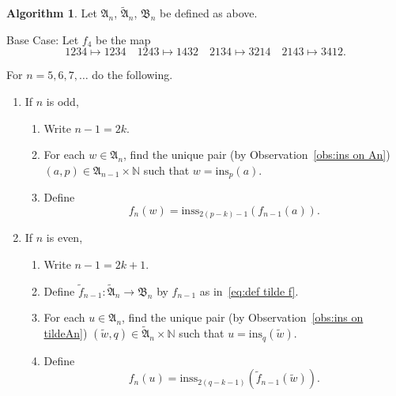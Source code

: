 \documentclass[12pt]{amsart}
\theoremstyle{definition}
\newtheorem{alg}[thm]{Algorithm}
\numberwithin{equation}{section}
\newcommand{\ins}[1]{\mathrm{ins}_{#1}}
\newcommand{\inss}[1]{\mathrm{inss}_{#1}}
\begin{document}
\begin{alg}\label{keyalg}
Let $\mathfrak A_n$, $\tilde{\mathfrak A}_n$, $\mathfrak B_n$ be defined as above.

Base Case: Let $f_4$ be the map
\begin{equation}\label{alg base case}
    1234 \longmapsto 1234 \quad 1243 \longmapsto 1432 \quad 2134 \longmapsto 3214 \quad 2143 \longmapsto 3412.
\end{equation}

For $n=5,6,7,\dotsc$ do the following.
\begin{enumerate}
\item If $n$ is odd,
\begin{enumerate}
    \item[a.] Write $n-1 = 2k$.
    \item[b.] For each $w\in \mathfrak A_n$, find the unique pair (by Observation~\ref{obs:ins on An}) $(a,p) \in \mathfrak A_{n-1} \times \mathbb N$ such that $w = \ins p (a)$.
    \item[c.] Define \begin{equation}\label{oddn+1}
    f_n(w) = \inss{2(p-k)-1}(f_{n-1}(a)).
    \end{equation}
\end{enumerate}
\item If $n$ is even,
\begin{enumerate}
    \item[a.] Write $n-1 = 2k+1$.
    \item[b.] Define $\tilde{f}_{n-1} : \tilde{\mathfrak A}_n \rightarrow \mathfrak B_n$ by $f_{n-1}$ as in~\eqref{eq:def tilde f}.
    \item[c.] For each $u \in \mathfrak A_{n}$, find the unique pair (by Observation~\ref{obs:ins on tildeAn}) $(\tilde{w},q) \in \tilde{\mathfrak A}_n \times \mathbb N$ such that $u=\ins q (\tilde{w})$.
    \item[d.] Define \begin{equation}\label{evenn+1}
        f_n(u) = \inss{2(q-k-1)}(\tilde{f}_{n-1}(\tilde{w})).
    \end{equation}
\end{enumerate}
\end{enumerate}

\end{alg}
\end{document}
